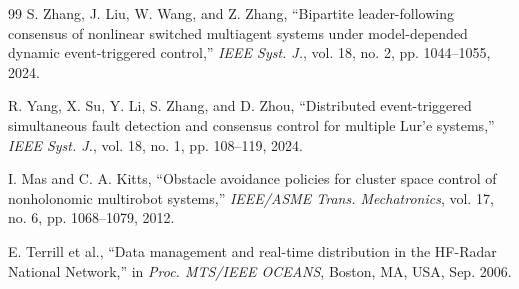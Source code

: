 \documentclass[lettersize,journal]{IEEEtran}
\begin{document}
\begin{thebibliography}{99}
 S. Zhang, J. Liu, W. Wang, and Z. Zhang, ``Bipartite
leader-following consensus of nonlinear switched multiagent systems under
model-depended dynamic event-triggered control,'' \textit{IEEE Syst. J.},
vol. 18, no. 2, pp. 1044--1055, 2024.

 R. Yang, X. Su, Y. Li, S. Zhang, and D. Zhou, ``Distributed
event-triggered simultaneous fault detection and consensus control for
multiple Lur'e systems,'' \textit{IEEE Syst. J.}, vol. 18, no. 1,
pp. 108--119, 2024.

 I. Mas and C. A. Kitts, ``Obstacle avoidance policies for cluster
space control of nonholonomic multirobot systems,'' \textit{IEEE/ASME Trans.
Mechatronics}, vol. 17, no. 6, pp. 1068--1079, 2012.

 E. Terrill et al., ``Data management and real-time distribution
in the HF-Radar National Network,'' in \textit{Proc. MTS/IEEE OCEANS},
Boston, MA, USA, Sep. 2006.

\end{thebibliography}
\end{document}
